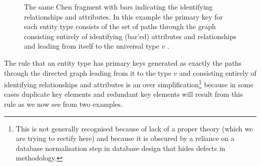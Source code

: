 \documentclass[10pt,a4paper]{article}
\newcommand{\veee}{v}
\begin{document}
\begin{figure} [h]  %
\begin{center}
\barstrue

\end{center}
\caption{The same Chen fragment with bars indicating the identifying relationships and attributes. In this example the primary key for each entity type consists of the set of paths through the graph consisting entirely
of identifying (bar'ed) attributes and relationships and leading from itself to the universal type $\veee$ .}
\label{chenfragment}
\end{figure}

The rule that an entity type has primary keys generated as exactly the paths through the directed graph leading from it
to the type $\veee$ and consisting entirely of identifying relationships and attributes is 
an over simplification\footnote{This is not generally recognised because 
of lack of a proper theory (which we are trying to rectify  here) and because it is obscured by a reliance on
a database normalisation step in database design that hides defects in methodology.}
because in some cases duplicate key elements and redundant key elements will result from this rule as we now see
from two examples.
\end{document}
